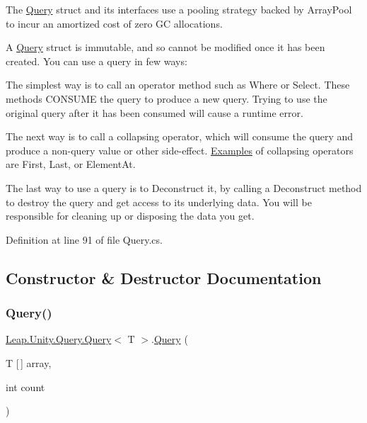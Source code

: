 The \mbox{\hyperlink{struct_leap_1_1_unity_1_1_query_1_1_query}{Query}} struct and its interfaces use a pooling strategy backed by Array\+Pool to incur an amortized cost of zero GC allocations.

A \mbox{\hyperlink{struct_leap_1_1_unity_1_1_query_1_1_query}{Query}} struct is immutable, and so cannot be modified once it has been created. You can use a query in few ways\+:
\begin{DoxyItemize}
\item The simplest way is to call an operator method such as Where or Select. These methods C\+O\+N\+S\+U\+ME the query to produce a new query. Trying to use the original query after it has been consumed will cause a runtime error.
\item The next way is to call a collapsing operator, which will consume the query and produce a non-\/query value or other side-\/effect. \mbox{\hyperlink{namespace_leap_1_1_unity_1_1_examples}{Examples}} of collapsing operators are First, Last, or Element\+At.
\item The last way to use a query is to Deconstruct it, by calling a Deconstruct method to destroy the query and get access to its underlying data. You will be responsible for cleaning up or disposing the data you get. 
\end{DoxyItemize}

Definition at line 91 of file Query.\+cs.



\subsection{Constructor \& Destructor Documentation}
\mbox{\label{struct_leap_1_1_unity_1_1_query_1_1_query_a045e15022385ac33bf7ea2448de59f93}} 
\subsubsection{\texorpdfstring{Query()}{Query()}\hspace{0.1cm}{\footnotesize\ttfamily [1/3]}}
{\footnotesize\ttfamily \mbox{\hyperlink{struct_leap_1_1_unity_1_1_query_1_1_query}{Leap.\+Unity.\+Query.\+Query}}$<$ T $>$.\mbox{\hyperlink{struct_leap_1_1_unity_1_1_query_1_1_query}{Query}} (\begin{DoxyParamCaption}\item[{T \mbox{[}$\,$\mbox{]}}]{array,  }\item[{int}]{count }\end{DoxyParamCaption})}



